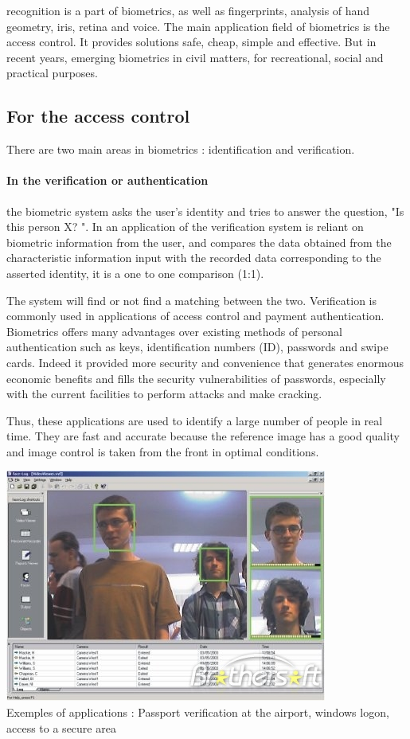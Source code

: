  recognition is a part of biometrics, as well as fingerprints, analysis of hand geometry, iris, retina and voice.
The main application field of biometrics is the access control. It provides solutions safe, cheap, simple and effective.
But in recent years, emerging biometrics in civil matters, for recreational, social and practical purposes.

\subsection{For the access control}

There are two main areas in biometrics : identification and verification.

\paragraph{In the verification or authentication} the biometric system asks the user's identity and tries to answer the question, "Is this person X? ". In an application of the verification system is reliant on biometric information from the user, and compares the data obtained from the characteristic information input with the recorded data corresponding to the asserted identity, it is a one to one comparison (1:1).

The system will find or not find a matching between the two. Verification is commonly used in applications of access control and payment authentication. Biometrics offers many advantages over existing methods of personal authentication such as keys, identification numbers (ID), passwords and swipe cards. Indeed it provided more security and convenience that generates enormous economic benefits and fills the security vulnerabilities of passwords, especially with the current facilities to perform attacks and make cracking.

Thus, these applications are used to identify a large number of people in real time. They are fast and accurate because the reference image has a good quality and image control is taken from the front in optimal conditions.

\includegraphics[width=\linewidth]{img/face_recognition_civil}
~\\
Exemples of applications : Passport verification at the airport, windows logon, access to a secure area 

